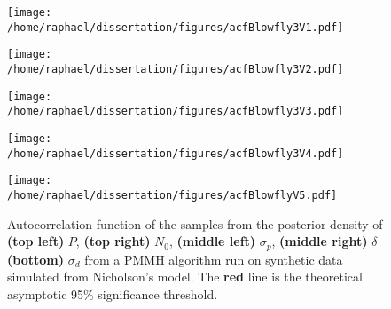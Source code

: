 \documentclass[12pt]{article}
\begin{document}
\begin{appendices}
	\begin{figure}[htb]
		\centering
		\begin{minipage}{0.49\textwidth}
			\centering
			\texttt{[image: /home/raphael/dissertation/figures/acfBlowfly3V1.pdf]}
		\end{minipage}
		\begin{minipage}{0.49\textwidth}
			\centering
			\texttt{[image: /home/raphael/dissertation/figures/acfBlowfly3V2.pdf]}
		\end{minipage}
		\begin{minipage}{0.49\textwidth}
			\centering
			\texttt{[image: /home/raphael/dissertation/figures/acfBlowfly3V3.pdf]}
		\end{minipage}
		\begin{minipage}{0.49\textwidth}
			\centering
			\texttt{[image: /home/raphael/dissertation/figures/acfBlowfly3V4.pdf]}
		\end{minipage}
		\begin{minipage}{0.49\textwidth}
			\centering
			\texttt{[image: /home/raphael/dissertation/figures/acfBlowflyV5.pdf]}
		\end{minipage}
		\caption[Autocorrelation functions of the samples from a PMMH algorithm run on synthetic data, Nicholson's model]{Autocorrelation function of the samples from the posterior density of \textbf{(top left)} $P$, \textbf{(top right)} $N_0$,  \textbf{(middle left)} $\sigma_p$,  \textbf{(middle right)} $\delta$ \textbf{(bottom)} $\sigma_d$ from a PMMH algorithm run on synthetic data simulated from Nicholson's model. The \textbf{red} line is the theoretical asymptotic 95\% significance threshold.}
		\label{fig:acfBlowfly}
	\end{figure}
	

\end{appendices}
\end{document}

